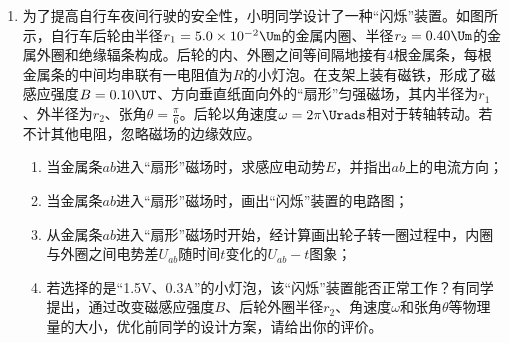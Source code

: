 \documentclass[\gkver]{gaokaozhenti}
\begin{document}
\begin{enumerate}
{（3）根据题设，墨滴运动轨迹如图，设圆周运动半径为 $R'$，有 $qv_{0}B'=m\frac{v_{0}^{2}}{R'}$。由图示可得 $R'^{2}=d^{2}+\left(R'-\frac{d}{2}\right)^{2}$，得 $R'=\frac{5}{4}d$。

联立解得 $B'=\frac{4v_{0}U}{5gd^{2}}$。
}

\item
为了提高自行车夜间行驶的安全性，小明同学设计了一种“闪烁”装置。如图所示，自行车后轮由半径$r_{1}=5.0\times10^{-2}\Um$的金属内圈、半径$r_{2}=0.40\Um$的金属外圈和绝缘辐条构成。后轮的内、外圈之间等间隔地接有4根金属条，每根金属条的中间均串联有一电阻值为$R$的小灯泡。在支架上装有磁铁，形成了磁感应强度$B=0.10\UT$、方向垂直纸面向外的“扇形”匀强磁场，其内半径为$r_{1}$、外半径为$r_{2}$、张角$\theta=\frac{\pi }{6}$。后轮以角速度$\omega=2\pi\Urads$相对于转轴转动。若不计其他电阻，忽略磁场的边缘效应。
\begin{enumerate}
	\item
	当金属条$ab$进入“扇形”磁场时，求感应电动势$E$，并指出$ab$上的电流方向；
	\item
	当金属条$ab$进入“扇形”磁场时，画出“闪烁”装置的电路图；
	\item
	从金属条$ab$进入“扇形”磁场时开始，经计算画出轮子转一圈过程中，内圈与外圈之间电势差$U_{ab}$随时间$t$变化的$U_{ab}-t$图象；
	\item
	若选择的是“1.5V、0.3A”的小灯泡，该“闪烁”装置能否正常工作？有同学提出，通过改变磁感应强度$B$、后轮外圈半径$r_{2}$、角速度$\omega$和张角$\theta$等物理量的大小，优化前同学的设计方案，请给出你的评价。
\end{enumerate}
\end{enumerate}
\end{document}
